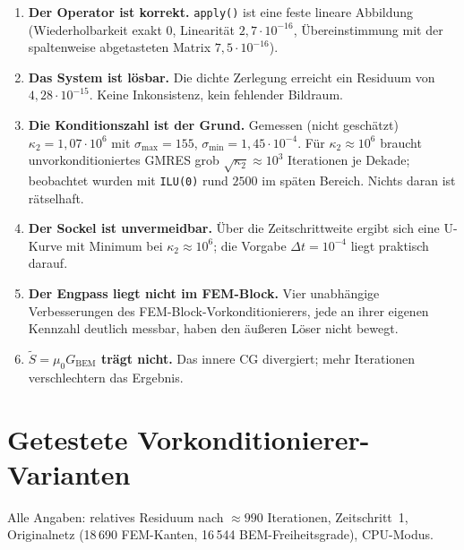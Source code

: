 \documentclass[11pt,a4paper]{article}
\newcommand{\code}[1]{\texttt{\small #1}}
\newcommand{\kappazwei}{\kappa_2}
\begin{document}
\begin{enumerate}
\item \textbf{Der Operator ist korrekt.} \code{apply()} ist eine feste lineare
  Abbildung (Wiederholbarkeit exakt $0$, Linearität $2{,}7\cdot10^{-16}$,
  Übereinstimmung mit der spaltenweise abgetasteten Matrix
  $7{,}5\cdot10^{-16}$).

\item \textbf{Das System ist lösbar.} Die dichte Zerlegung erreicht ein
  Residuum von $4{,}28\cdot10^{-15}$. Keine Inkonsistenz, kein fehlender
  Bildraum.

\item \textbf{Die Konditionszahl ist der Grund.} Gemessen (nicht geschätzt)
  $\kappazwei = 1{,}07\cdot10^{6}$ mit $\sigma_{\max}=155$,
  $\sigma_{\min}=1{,}45\cdot10^{-4}$. Für $\kappazwei\approx10^{6}$ braucht
  unvorkonditioniertes GMRES grob $\sqrt{\kappazwei}\approx10^{3}$ Iterationen
  je Dekade; beobachtet wurden mit \code{ILU(0)} rund $2500$ im späten Bereich.
  Nichts daran ist rätselhaft.

\item \textbf{Der Sockel ist unvermeidbar.} Über die Zeitschrittweite ergibt
  sich eine U-Kurve mit Minimum bei $\kappazwei\approx10^{6}$; die Vorgabe
  $\Delta t = 10^{-4}$ liegt praktisch darauf.

\item \textbf{Der Engpass liegt nicht im FEM-Block.} Vier unabhängige
  Verbesserungen des FEM-Block-Vorkonditionierers, jede an ihrer eigenen
  Kennzahl deutlich messbar, haben den äußeren Löser nicht bewegt.

\item \textbf{$\tilde S = \mu_0 G_{\mathrm{BEM}}$ trägt nicht.} Das innere CG
  divergiert; mehr Iterationen verschlechtern das Ergebnis.
\end{enumerate}

\section{Getestete Vorkonditionierer-Varianten}

Alle Angaben: relatives Residuum nach $\approx990$ Iterationen, Zeitschritt~1,
Originalnetz (18\,690 FEM-Kanten, 16\,544 BEM-Freiheitsgrade), CPU-Modus.
\end{document}
